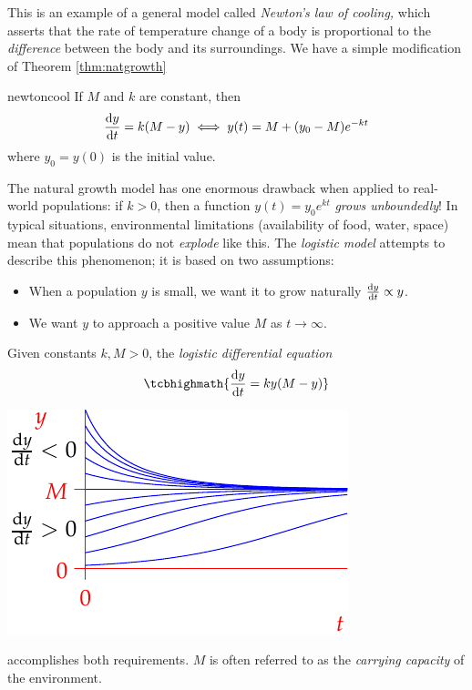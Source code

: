 \goodbreak

This is an example of a general model called \emph{Newton's law of cooling,} which asserts that the rate of temperature change of a body is proportional to the \emph{difference} between the body and its surroundings. We have a simple modification of Theorem \ref{thm:natgrowth}

\begin{cor}{}{newtoncool}
	If $M$ and $k$ are constant, then
	\[
		\diff[y]{t}=k(M-y)\iff y(t)=M+(y_0-M)e^{-kt}
	\]
	where $y_0=y(0)$ is the initial value.
\end{cor}




The natural growth model has one enormous drawback when applied to real-world populations: if $k>0$, then a function $y(t)=y_0e^{kt}$ \emph{grows unboundedly}! In typical situations, environmental limitations (availability of food, water, space) mean that populations do not \emph{explode} like this. The \emph{logistic model} attempts to describe this phenomenon; it is based on two assumptions:\par
\begin{minipage}[t]{0.6\linewidth}\vspace{-5pt}
	\begin{itemize}
	  \item When a population $y$ is small, we want it to grow naturally $\diff[y]{t}\propto y$.
		\item We want $y$ to approach a positive value $M$ as $t\to \infty$.
	\end{itemize}
	Given constants $k,M>0$, the \emph{logistic differential equation}
	\[
		\tcbhighmath{\diff[y]{t}=ky(M-y)}
	\]
\end{minipage}
\hfill
\begin{minipage}[t]{0.39\linewidth}\vspace{0pt}
	\flushright\includegraphics{logisticsf}
\end{minipage}\medbreak
accomplishes both requirements. $M$ is often referred to as the \emph{carrying capacity} of the environment.



